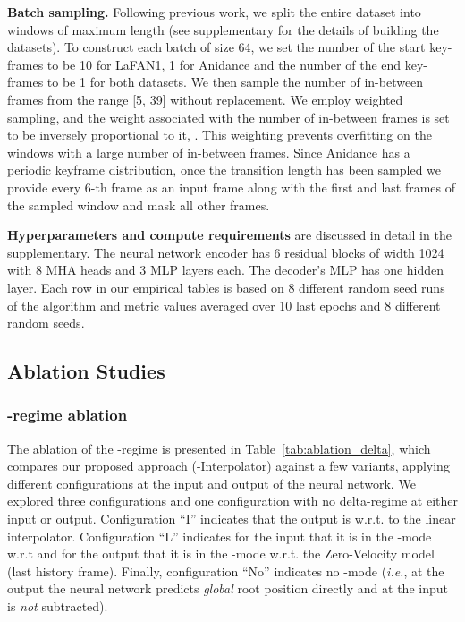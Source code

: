 \documentclass[letterpaper]{article} \usepackage[]{aaai23}  \usepackage{times}  \usepackage{helvet}  \usepackage{courier}  \usepackage[hyphens]{url}  \usepackage{graphicx} \urlstyle{rm} \def\UrlFont{\rm}  \usepackage{natbib}  \usepackage{caption} \frenchspacing  \setlength{\pdfpagewidth}{8.5in} \setlength{\pdfpageheight}{11in}
\begin{document}
\textbf{Batch sampling.} Following previous work, we split the entire dataset into windows of maximum length  (see supplementary for the details of building the datasets). To construct each batch of size 64, we set the number of the start key-frames to be 10 for LaFAN1, 1 for Anidance and the number of the end key-frames to be 1 for both datasets. We then sample the number of in-between frames from the range [5, 39] without replacement. We employ weighted sampling, and the weight associated with the number of in-between frames  is set to be inversely proportional to it, . This weighting prevents overfitting on the windows with a large number of in-between frames.
Since Anidance has a periodic keyframe distribution, once the transition length has been sampled we provide every 6-th frame as an input frame along with the first and last frames of the sampled window and mask all other frames.



\textbf{Hyperparameters and compute requirements} are discussed in detail in the supplementary. The neural network encoder has 6 residual blocks  of width 1024 with 8 MHA heads and 3 MLP layers each. The decoder's MLP has one hidden layer. Each row in our empirical tables is based on 8 different random seed runs of the algorithm and metric values averaged over 10 last epochs and 8 different random seeds. 





\subsection{Ablation Studies}

\subsubsection{-regime ablation}

The ablation of the -regime is presented in Table~\ref{tab:ablation_delta}, which compares our proposed approach (-Interpolator) against a few variants, applying different  configurations at the input and output of the neural network. We explored three  configurations and one configuration with no delta-regime at either input or output. Configuration ``I'' indicates that the output is  w.r.t. to the linear interpolator. Configuration ``L'' indicates for the input that it is in the -mode w.r.t  and for the output that it is in the -mode w.r.t. the Zero-Velocity model (last history frame). Finally, configuration ``No'' indicates no -mode (\emph{i.e.}, at the output the neural network predicts \emph{global} root position directly and at the input  is \emph{not} subtracted). 
\end{document}
